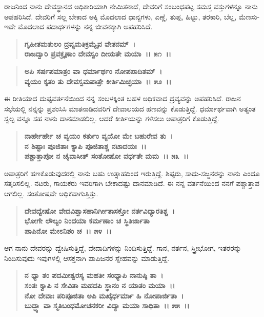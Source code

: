 ರಾಜನಿಂದ ನಾನು ದೇವಸ್ಥಾನದ ಅಧಿಕಾರಿಯಾಗಿ ನೇಮಿತನಾದೆ, ದೇವರಿಗೆ ಸಂಬಂಧಪಟ್ಟ ಸಮಸ್ತ ವಸ್ತುಗಳನ್ನೂ ನಾನು ಅಪಹರಿಸಿದೆ. ದೇವರಿಗೆ ಸಲ್ಲ ಬೇಕಾದ ಅಕ್ಕಿ ಮೊದಲಾದ ಧಾನ್ಯಗಳು, ಎಣ್ಣೆ, ತುಪ್ಪ, ಹಿಟ್ಟು, ತರಕಾರಿ, ಬೆಲ್ಲ, ಮೆಣಸು-ಇವೇ ಮೊದಲಾದ ಪದಾರ್ಥಗಳನ್ನು ನನ್ನ ಜೀವನಕ್ಕಾಗಿ ಅಪಹರಿಸಿದೆ.

\begin{verse}
\textbf{ಗೃಹೀತಮತುಲಂ ದ್ರವ್ಯಮತಿಕ್ರಮ್ಯೈವ ವೇತನಮ್~।}\\\textbf{ರಾಜದ್ವಾರಿ ಪ್ರವಕ್ರೄಣಾಂ ದೇವಸ್ವಂ ದೀಯತೇ ಮಯಾ~।। ೫೧~।। }
\end{verse}

\begin{verse}
\textbf{ಅಪಿ ಸರ್ಷಪಮಾತ್ರಂ ವಾ ಧರ್ಮಾರ್ಥಂ ನೋಪಪಾದಿತಮ್~।}\\\textbf{ವ್ಯಯಂ ಕೃತಂ ತು ದೇವಸ್ವಮಪಾತ್ರೇ ಕೀರ್ತಿಮಿಚ್ಛಯಾ~।। ೫೨~।।}
\end{verse}

ಈ ರೀತಿಯಾದ ದುಷ್ಟವರ್ತನೆಯಿಂದ ನನ್ನ ಸಂಬಳಕ್ಕಿಂತ ಬಹಳ ಅಧಿಕವಾದ ದ್ರವ್ಯವನ್ನು ಅಪಹರಿಸಿದೆ. ರಾಜನ ಸಭೆಯಲ್ಲಿ ನನ್ನನ್ನು ಪ್ರಶಂಸಿಸಿ ಮಾತನಾಡಿದವರಿಗೆ ದೇವಾಲಯದ ಹಣವನ್ನು ಕೊಡುತ್ತಿದ್ದೆ. ಧರ್ಮಾರ್ಥವಾಗಿ ಅತ್ಯಂತ ಸ್ವಲ್ಪ ವನ್ನೂ ಸಹ ನಾನು ದಾನಮಾಡಲಿಲ್ಲ. ಆದರೆ ಕೀರ್ತಿಯನ್ನು ಗಳಿಸಲು ಅಪಾತ್ರರಿಗೆ ಕೊಡುತ್ತಿದ್ದೆ.

\begin{verse}
\textbf{ನಾರ್ಹೇರ್ಹೇ ಚ ವ್ಯಯಂ ಕರ್ತುಂ ವ್ಯಯೋ ಮೇ ಬಹುರೇವ ತು~।}\\\textbf{ನ ಶಿಷ್ಟಾಃ ಪೂಜಿತಾಃ ಕ್ಯಾಪಿ ಪೂಜಿತಾಶ್ಚ ನಟಾದಯಃ~।। }\\\textbf{ಪಶ್ಚಾತ್ತಾಪೋ ನ ಚೈವಾಸೀತ್ ಸಂತೋಷೋ ವರ್ಧತೇ ಮಮ~।। ೫೩~।।}
\end{verse}

ಅಪಾತ್ರರಿಗೆ ಹಣಕೊಡುವುದರಲ್ಲಿ ನಾನು ಬಹು ಉತ್ಸಾಹದಿಂದ ಇರುತ್ತಿದ್ದೆ. ಶಿಷ್ಟರು, ಸಾಧು-\-ಸಜ್ಜನರನ್ನು ನಾನು ಎಂದೂ ಸತ್ಕರಿಸಲಿಲ್ಲ. ನಟರು, ಗಾಯಕರು ಇವರಿಗಾಗಿ ಬೇಕಾದಷ್ಟು ದಾನಮಾಡಿದೆ. ಈ ನನ್ನ ವರ್ತನೆಯಿಂದ ನನಗೆ ಪಶ್ಚಾತ್ತಾಪ ಆಗಲಿಲ್ಲ. ಸಂತೋಷವೇ ಅಧಿಕವಾಗುತ್ತಿತ್ತು.

\begin{verse}
\textbf{ದೇವದ್ವೇಷೋ ವೇದವಿಶ್ವಾಸಹಾನಿರ್ಗೀತಾಸಕ್ತೋ ನರ್ತವಿದ್ಯಾರತಿಶ್ಚ~।}\\\textbf{ಭೋಗೇ ಲೌಲ್ಯಂ ನಿಂದಯಾ ಕರ್ಮಣಾಂ ಚ ಸ್ಥಿತಿರ್ಜಾತಾ} \\\textbf{ಪಾಪಿನೋ ಮೇಽನಿಶಂ ಚ~।। ೫೪~।।}
\end{verse}

ಆಗ ನಾನು ದೇವರನ್ನು ದ್ವೇಷಿಸುತ್ತಿದ್ದೆ, ವೇದಾದಿಗಳನ್ನು ನಿಂದಿಸುತ್ತಿದ್ದೆ. ಗಾನ, ನರ್ತನ, ಸ್ತ್ರೀಭೋಗ, ಇತರರನ್ನು ನಿಂದಿಸುವುದು ಇವುಗಳಲ್ಲಿ ಆಸಕ್ತನಾಗಿ ಪಾಪಿಜನರ ಸ್ನೇಹವನ್ನು ಮಾಡುತ್ತಿದ್ದೆ.

\begin{verse}
\textbf{ನ ಧ್ಯಾ ತಂ ಪದಮೀಶ್ವರಸ್ಯ ಮಹತೀ ಸಂಧ್ಯಾಪಿ ನಾನುಷ್ಠಿ ತಾ~।}\\\textbf{ಸಂತಃ ಕ್ವಾಪಿ ನ ಸೇವಿತಾ ಮಹದಪಿ ಸ್ಥಾನಂ ನ ಯಾತಂ ಮಯಾ~।। }\\\textbf{ನೋ ದೇವಾಃ ಪರಿಪೂಜಿತಾ ಅಪಿ ಮಖೈರ್ಧರ್ಮಾ ಹಿ ನೋಪಾರ್ಜಿತಾ~।}\\\textbf{ಬುದ್ಧ್ಯಾ ವಾ ಸ್ಮತಿಬಂಧಮೋಚನಕರೀ ವಿದ್ಯಾ ಮಯಾ ಸಾಧಿತಾ~।। ೫೫~।।}
\end{verse}

